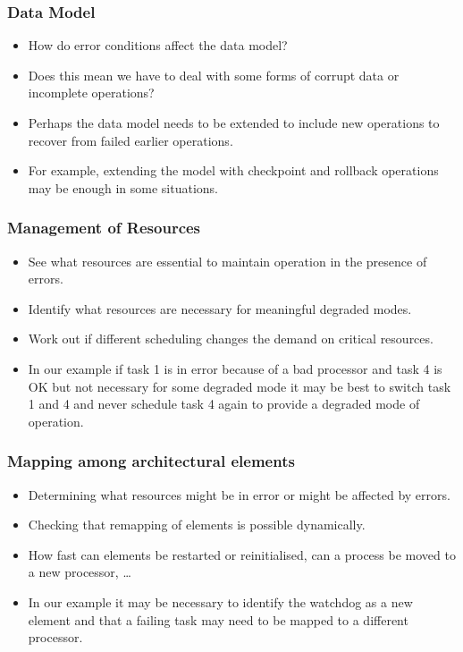 \documentclass[a4paper]{article}
\begin{document}
\subsubsection{Data Model}
\begin{itemize}
\item{How do error conditions affect the data model?}
\item{Does this mean we have to deal with some forms of corrupt data or incomplete operations?}
\item{Perhaps the data model needs to be extended to include new operations to recover from failed earlier operations.}
\item{For example, extending the model with checkpoint and rollback operations may be enough in some situations.}
\end{itemize}

\subsubsection{Management of Resources}
\begin{itemize}
\item{See what resources are essential to maintain operation in the presence of errors.}
\item{Identify what resources are necessary for meaningful degraded modes.}
\item{Work out if different scheduling changes the demand on critical resources.}
\item{In our example if task 1 is in error because of a bad processor and task 4 is OK but not necessary for some degraded mode it may be best to switch task 1 and 4 and never schedule task 4 again to provide a degraded mode of operation.}
\end{itemize}

\subsubsection{Mapping among architectural elements}
\begin{itemize}
\item{Determining what resources might be in error or might be affected by errors.}
\item{Checking that remapping of elements is possible dynamically.}
\item{How fast can elements be restarted or reinitialised, can a process be moved to a new processor, …}
\item{In our example it may be necessary to identify the watchdog as a new element and that a failing task may need to be mapped to a different processor.}
\end{itemize}
\end{document}
